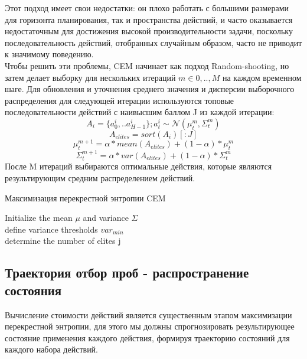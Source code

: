 \documentclass[a4paper,12pt]{article}
\begin{document}
Этот подход имеет свои недостатки: он плохо работать с большими размерами для горизонта планирования, так и пространства действий, и часто оказывается недостаточным для достижения высокой производительности задачи, поскольку последовательность действий, отобранных случайным образом, часто не приводит к значимому поведению.\\

Чтобы решить эти проблемы, CEM начинает как подход Random-shooting, но затем делает выборку для нескольких итераций $m \in {0,.., M}$ на каждом временном шаге. Для обновления и уточнения среднего значения и дисперсии выборочного распределения для следующей итерации используются топовые последовательности действий с наивысшим баллом J из каждой итерации:
$$A_i=\{a_0^i, .. a_{H-1}^i\};  a_t ^ i \sim \mathcal {N} (\mu_t ^ m, \Sigma_t ^ m)$$
$$A_{elites} =sort(A_i) [:J]$$
\newpage
$$\mu_t^{m+1}=\alpha *mean(A_{elites})+(1-\alpha)* \mu_t^m$$
$$\Sigma_t^{m+1}=\alpha * var(A_{elites})+(1-\alpha) *\Sigma_t^m$$
После M итераций выбираются оптимальные действия, которые являются результирующим средним распределением действий.\\

\begin{algorithm}[H]
\SetAlgoLined
\DontPrintSemicolon
\caption{Максимизация перекрестной энтропии CEM}
Initialize the mean $\mu$ and variance $\Sigma$\\
define variance thresholds $var_{min}$\\
determine the number of elites j\\
\end{algorithm}

\newpage
\subsection{Траектория отбор проб - распространение состояния}
Вычисление стоимости действий является существенным этапом максимизации перекрестной энтропии, для этого мы должны спрогнозировать результирующее состояние применения каждого действия, формируя траекторию состояний для каждого набора действий.\\
\end{document}
